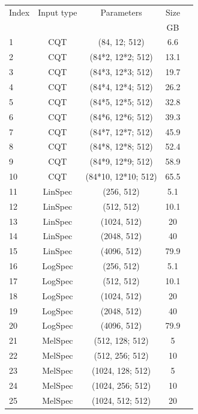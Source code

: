 \documentclass{ieeeaccess}
\begin{document}
\begin{table}[ht]
\begin{tabular}{lcccc}
\toprule
Index  & Input type      & Parameters       & Size \\
&&  & GB\\ \midrule
1  & CQT      & (84, 12; 512)       & 6.6           \\ 
2  & CQT      & (84*2, 12*2; 512)   & 13.1          \\ 
3  & CQT      & (84*3, 12*3; 512)   & 19.7          \\ 
4  & CQT      & (84*4, 12*4; 512)   & 26.2          \\ 
5  & CQT      & (84*5, 12*5; 512)   & 32.8          \\ 
6  & CQT      & (84*6, 12*6; 512)   & 39.3          \\ 
7  & CQT      & (84*7, 12*7; 512)   & 45.9          \\ 
8  & CQT      & (84*8, 12*8; 512)   & 52.4          \\ 
9  & CQT      & (84*9, 12*9; 512)   & 58.9          \\ 
10 & CQT      & (84*10, 12*10; 512) & 65.5          \\ 
11 & LinSpec     & (256, 512)          & 5.1        \\ 
12 & LinSpec     & (512, 512)          & 10.1       \\ 
13 & LinSpec     & (1024, 512)         & 20         \\ 
14 & LinSpec     & (2048, 512)         & 40         \\ 
15 & LinSpec     & (4096, 512)         & 79.9       \\ 
16 & LogSpec & (256, 512)          & 5.1            \\ 
17 & LogSpec & (512, 512)          & 10.1           \\ 
18 & LogSpec & (1024, 512)         & 20             \\ 
19 & LogSpec & (2048, 512)         & 40             \\ 
20 & LogSpec & (4096, 512)         & 79.9           \\ 
21 & MelSpec      & (512, 128; 512)     & 5         \\ 
22 & MelSpec      & (512, 256; 512)     & 10        \\ 
23 & MelSpec      & (1024, 128; 512)    & 5         \\ 
24 & MelSpec      & (1024, 256; 512)    & 10        \\ 
25 & MelSpec      & (1024, 512; 512)    & 20        \\ 

\end{tabular}
\end{table}
\end{document}
